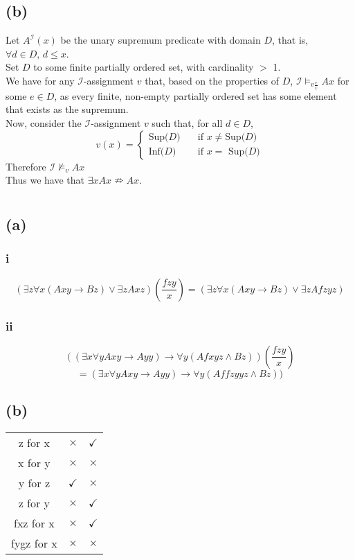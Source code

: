 \documentclass[11pt,oneside,a4paper]{article}
\newcommand{\iassv}{$\mathcal{I}$-assignment $v$ }
\newcommand{\ck}{$\checkmark$}
\newcommand{\cs}{$\times$}
\begin{document}
\subsection*{(b)}
Let $A^\mathcal{I}(x)$ be the unary supremum predicate with domain $D$, that is, $\forall d \in D, \, d \leq x$.\\
Set $D$ to some finite partially ordered set, with cardinality $>$ 1.\\
We have for any \iassv that, based on the properties of $D$, $\mathcal{I} \vDash _{v \frac{e}{x}} Ax$ for some $e \in D$, as every finite, non-empty partially ordered set has some element that exists as the supremum.\\
Now, consider the \iassv such that, for all $d \in D$,
\[ v(x) =
  \begin{cases}
    \text{Sup($D$)}      & \quad \text{if } x \neq \text{Sup($D$)}\\
    \text{Inf($D$)}  & \quad \text{if } x = \text{ Sup($D$)}
  \end{cases}
\]
Therefore $\mathcal{I} \nvDash_v Ax$\\
Thus we have that $\exists x Ax \nRightarrow Ax$.

\section{}
\subsection*{(a)}
\subsubsection*{i}
$$(\exists z \forall x (Axy \to Bz) \vee \exists z Axz)\left(\frac{fzy}{x}\right) = (\exists z \forall x (Axy \to Bz) \vee \exists z Afzyz)$$
\subsubsection*{ii}$$((\exists x \forall y Axy \to Ayy) \to \forall y (Afxyz \wedge Bz))\left(\frac{fzy}{x}\right)$$$$ = (\exists x \forall y Axy \to Ayy) \to \forall y (Affzyyz \wedge Bz))$$

\subsection*{(b)}
\begin{center}
\begin{tabular}{|c|c|c|}
\hline
z for x & \cs & \ck \\
x for y & \cs & \cs \\
y for z & \ck & \cs \\
z for y & \cs & \ck \\
fxz for x & \cs & \ck \\
fygz for x & \cs & \cs \\
\hline
\end{tabular}
\end{center}
\end{document}
